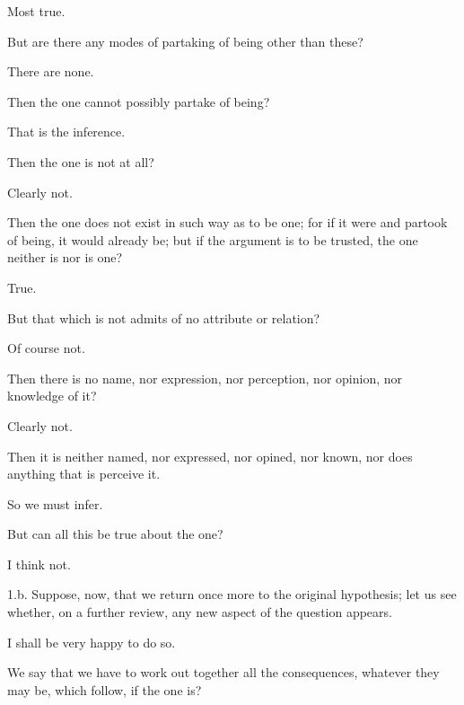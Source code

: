 \documentclass[11pt,letter]{article}
\begin{document}
\par  Most true.

\par  But are there any modes of partaking of being other than these?

\par  There are none.

\par  Then the one cannot possibly partake of being?

\par  That is the inference.

\par  Then the one is not at all?

\par  Clearly not.

\par  Then the one does not exist in such way as to be one; for if it were and partook of being, it would already be; but if the argument is to be trusted, the one neither is nor is one?

\par  True.

\par  But that which is not admits of no attribute or relation?

\par  Of course not.

\par  Then there is no name, nor expression, nor perception, nor opinion, nor knowledge of it?

\par  Clearly not.

\par  Then it is neither named, nor expressed, nor opined, nor known, nor does anything that is perceive it.

\par  So we must infer.

\par  But can all this be true about the one?

\par  I think not.

\par  1.b. Suppose, now, that we return once more to the original hypothesis; let us see whether, on a further review, any new aspect of the question appears.

\par  I shall be very happy to do so.

\par  We say that we have to work out together all the consequences, whatever they may be, which follow, if the one is?
\end{document}
